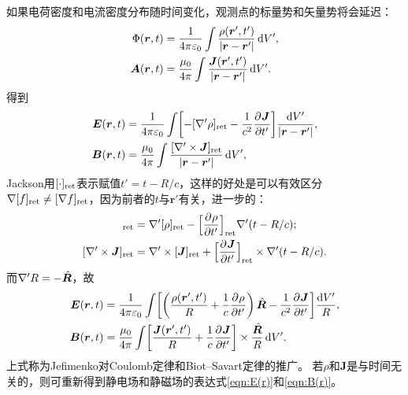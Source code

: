 如果电荷密度和电流密度分布随时间变化，观测点的标量势和矢量势将会延迟：
\begin{subequations}
    \begin{align}
        \Phi(\bm r,t) &= \frac1{4\pi\varepsilon_0}\int\frac{\rho(\bm r',t')}{\lvert\bm r - \bm r'\rvert}\mathop{}\!\mathrm{d} V',\\
        \bm A(\bm r,t) &= \frac{\mu_0}{4\pi}\int\frac{\bm J(\bm r',t')}{\lvert\bm r - \bm r'\rvert}\mathop{}\!\mathrm{d} V'.
    \end{align}
\end{subequations}
得到
\begin{subequations}
    \begin{align}
        \bm E(\bm r,t) &= \frac1{4\pi\varepsilon_0}\int\biggl[-[\nabla'\rho]_{\mathrm{ret}} - \frac1{c^2}\frac{\partial^{}\bm J}{\partial{t'}^{}}\biggr]\frac{\mathop{}\!\mathrm{d} V'}{\lvert\bm r - \bm r'\rvert},\\
        \bm B(\bm r,t) &= \frac{\mu_0}{4\pi}\int\frac{[\nabla' \times \bm J]_{\mathrm{ret}}}{\lvert\bm r - \bm r'\rvert}\mathop{}\!\mathrm{d} V',
    \end{align}
\end{subequations}
Jackson用$[\cdot]_{\mathrm{ret}}$表示赋值$t' = t - R/c$，这样的好处是可以有效区分$\nabla[f]_{\mathrm{ret}} \neq [\nabla f]_{\mathrm{ret}}$，因为前者的$t$与$\bm r'$有关，进一步的：
\begin{align*}
    [\nabla'\rho]_\ret &= \nabla'[\rho]_\ret - \Bigb{\pv\rho{t'}}_\ret\nabla'(t - R/c);\\
    [\nabla' \times \bm J]_\ret &= \nabla' \times [\bm J]_\ret + \Bigb{\pv{\bm J}{t'}}_\ret \times \nabla'(t - R/c).
\end{align*}
而$\nabla'R = -{\mathop{}\!\hat{\bm{R}}}$，故
\begin{subequations}
    \begin{align}
        \bm E(\bm r,t) &= \frac1{4\pi\varepsilon_0}\int\biggl[\biggl(\frac{\rho(\bm r',t')}R + \frac1c\frac{\partial^{}\rho}{\partial{t'}^{}}\biggr)\mathop{}\!\hat{\bm{R}} - \frac1{c^2}\frac{\partial^{}\bm J}{\partial{t'}^{}}\biggr]\frac{\mathop{}\!\mathrm{d} V'}R,\\
        \bm B(\bm r,t) &= \frac{\mu_0}{4\pi}\int\biggl[\frac{\bm J(\bm r',t')}R + \frac1c\frac{\partial^{}\bm J}{\partial{t'}^{}}\biggr] \times \frac{\mathop{}\!\hat{\bm{R}}}R\mathop{}\!\mathrm{d} V'.
    \end{align}
\end{subequations}
上式称为Jefimenko对Coulomb定律和Biot--Savart定律的推广。
若$\rho$和$\bm J$是与时间无关的，则可重新得到静电场和静磁场的表达式\eqref{eqn:E(r)}和\eqref{eqn:B(r)}。
